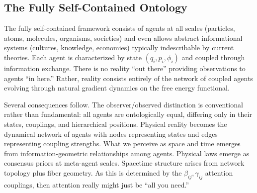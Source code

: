\documentclass[11pt]{article}
\begin{document}
\subsection{The Fully Self-Contained Ontology}

The fully self-contained framework consists of agents at all scales (particles, atoms, molecules, organisms, societies) and even allows abstract informational systems (cultures, knowledge, economies) typically indescribable by current theories. Each agent is characterized by state $(q_i, p_i, \phi_i)$ and coupled through information exchange. There is no reality ``out there'' providing observations to agents ``in here.'' Rather, reality consists entirely of the network of coupled agents evolving through natural gradient dynamics on the free energy functional.

Several consequences follow. The observer/observed distinction is conventional rather than fundamental: all agents are ontologically equal, differing only in their states, couplings, and hierarchical positions. Physical reality becomes the dynamical network of agents with nodes representing states and edges representing coupling strengths. What we perceive as space and time emerges from information-geometric relationships among agents. Physical laws emerge as consensus priors at meta-agent scales. Spacetime structure arises from network topology plus fiber geometry. As this is determined by the $\beta_{ij}, \gamma_{ij}$ attention couplings, then attention really might just be ``all you need.''
\end{document}
